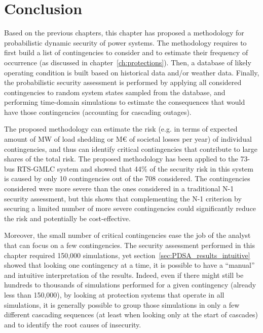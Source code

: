 \section{Conclusion}
\label{sec:PDSA_conclusion}

Based on the previous chapters, this chapter has proposed a methodology for probabilistic dynamic security of power systems. The methodology requires to first build a list of contingencies to consider and to estimate their frequency of occurrence (as discussed in chapter~\ref{ch:protections}). Then, a database of likely operating condition is built based on historical data and/or weather data. Finally, the probabilistic security assessment is performed by applying all considered contingencies to random system states sampled from the database, and performing time-domain simulations to estimate the consequences that would have those contingencies (accounting for cascading outages).

The proposed methodology can estimate the risk (e.g. in terms of expected amount of MW of load shedding or M€ of societal losses per year) of individual contingencies, and thus can identify critical contingencies that contribute to large shares of the total risk. The proposed methodology has been applied to the 73-bus RTS-GMLC system and showed that 44\% of the security risk in this system is caused by only 10 contingencies out of the 708 considered. The contingencies considered were more severe than the ones considered in a traditional N-1 security assessment, but this shows that complementing the N-1 criterion by securing a limited number of more severe contingencies could significantly reduce the risk and potentially be cost-effective.

Moreover, the small number of critical contingencies ease the job of the analyst that can focus on a few contingencies. The security assessment performed in this chapter required 150,000 simulations, yet section~\ref{sec:PDSA_results_intuitive} showed that looking one contingency at a time, it is possible to have a ``manual'' and intuitive interpretation of the results. Indeed, even if there might still be hundreds to thousands of simulations performed for a given contingency (already less than 150,000), by looking at protection systems that operate in all simulations, it is generally possible to group those simulations in only a few different cascading sequences (at least when looking only at the start of cascades) and to identify the root causes of insecurity.

